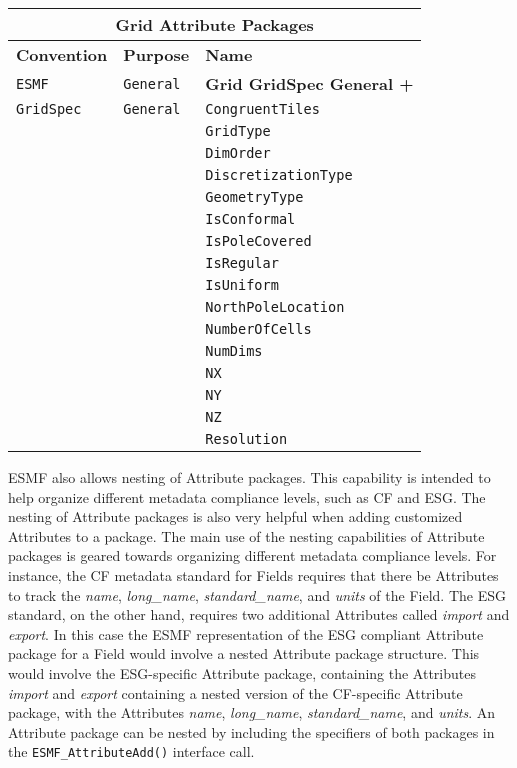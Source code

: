 \begin{tabular}{|p{4cm}|p{4cm}|p{6cm}|}
\hline
\multicolumn{3}{|c|}{{\bf \large Grid Attribute Packages}} \\
\hline\hline
{\bf Convention} & {\bf Purpose} & {\bf Name} \\
\hline\hline
{\tt ESMF} & {\tt General} & {\bf Grid GridSpec General +} \\
{\tt GridSpec} & {\tt General} & {\tt CongruentTiles} \\
 & & {\tt GridType} \\ 
 & & {\tt DimOrder} \\ 
 & & {\tt DiscretizationType} \\ 
 & & {\tt GeometryType} \\ 
 & & {\tt IsConformal} \\ 
 & & {\tt IsPoleCovered} \\ 
 & & {\tt IsRegular} \\ 
 & & {\tt IsUniform} \\ 
 & & {\tt NorthPoleLocation} \\ 
 & & {\tt NumberOfCells} \\ 
 & & {\tt NumDims} \\ 
 & & {\tt NX} \\ 
 & & {\tt NY} \\ 
 & & {\tt NZ} \\ 
 & & {\tt Resolution} \\ 
\hline
\end{tabular}
\label{GridAttributePackages}

\vspace{18pt}

\vspace{18pt}

ESMF also allows nesting of Attribute packages.  This capability is intended to help organize different metadata compliance levels, such as CF and ESG.  The nesting of Attribute packages is also very helpful when adding customized Attributes to a package.  The main use of the nesting capabilities of Attribute packages is geared towards organizing different metadata compliance levels.  For instance, the CF metadata standard for Fields requires that there be Attributes to track the {\it name}, {\it long\_name}, {\it standard\_name}, and {\it units} of the Field.  The ESG standard, on the other hand, requires two additional Attributes called {\it import} and {\it export}.  In this case the ESMF representation of the ESG compliant Attribute package for a Field would involve a nested Attribute package structure.  This would involve the ESG-specific Attribute package, containing the Attributes {\it import} and {\it export} containing a nested version of the CF-specific Attribute package, with the Attributes {\it name}, {\it long\_name}, {\it standard\_name}, and {\it units}.  An Attribute package can be nested by including the specifiers of both packages in the {\tt ESMF\_AttributeAdd()} interface call.  

